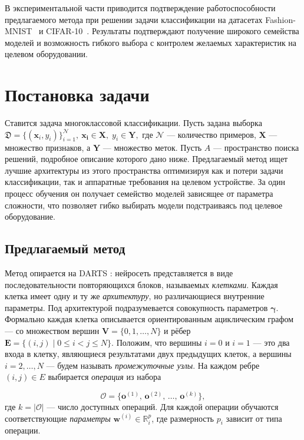 \documentclass{article}
\begin{document}
В экспериментальной части приводится подтверждение работоспособности предлагаемого метода при решении задачи классификации на датасетах Fashion-MNIST~\cite{fashion_mnist} и CIFAR-10~\cite{cifar10}. Результаты подтверждают получение широкого семейства моделей и возможность гибкого выбора с контролем желаемых характеристик на целевом оборудовании.


\section{Постановка задачи}

Ставится задача многоклассовой классификации. Пусть задана выборка $
    \mathfrak D = \{(\boldsymbol{x}_i, y_i)\}_{i=1}^{\mathcal N},
    \ \boldsymbol{x_i} \in \mathbf X,\; y_i \in \mathbf Y, $
где $\mathcal N$ — количество примеров, $\mathbf X$ — множество признаков, а $\mathbf Y$ --- множество меток. Пусть $\textit{A}$ --- пространство поиска решений, подробное описание которого дано ниже.
Предлагаемый метод ищет лучшие архитектуры из этого пространства оптимизируя как и потери задачи классификации, так и аппаратные требования на целевом устройстве. За один процесс обучения он получает семейство моделей зависящее от параметра сложности, что позволяет гибко выбирать модели подстраиваясь под целевое оборудование.   

\subsection{Предлагаемый метод}

Метод опирается на DARTS%
: нейросеть представляется в виде последовательности повторяющихся блоков, называемых \textit{клетками}. Каждая клетка имеет одну и ту же \textit{архитектуру}, но различающиеся внутренние параметры. Под архитектурой подразумевается совокупность параметров $\boldsymbol\gamma$. Формально каждая клетка описывается ориентированным ациклическим графом --- со множеством вершин $ \textbf{V} = \{0,1,\dots,N\}$ и рёбер $ \textbf{E} = \bigl\{(i,j)\mid 0 \le i < j \le N\bigr\}.$ Положим, что вершины $i=0$ и $i=1$ --- это два входа в клетку, являющиеся результатами двух предыдущих клеток, а вершины $i=2,\dots,N$ --- будем называть \textit{промежуточные узлы}. На каждом ребре $(i,j)\in E$ выбирается \textit{операция} из набора

$$
    \mathcal O = \bigl\{\mathbf{o}^{(1)},\,\mathbf{o}^{(2)},\,\dots,\,\mathbf{o}^{(k)}\bigr\},
$$
где $k = |\mathcal O|$ — число доступных операций. Для каждой операции обучаются соответствующие \textit{параметры} $\boldsymbol{w}^{(i)} \in \mathbb R^p_i$, где размерность $p_i$ зависит от типа операции. %
\end{document}
